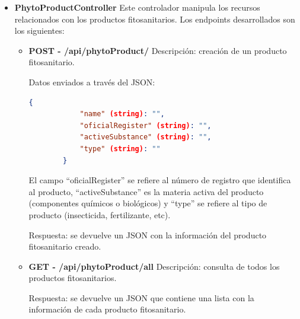 \begin{itemize}
\begin{itemize}
        Respuesta: se envía una respuesta sin contenido con código 204.

        \item \textbf{GET - /api/entity/user/{userId}} \newline
        Descripción: obtiene todas las entidades de un usuario específico. El ID del usuario es pasado como variable de la URL. 
        
        Respuesta: se devuelve un JSON que contiene una lista con la información de la asignación del usuario con cada entidad 
        (roles y permisos).
    \end{itemize}

    \item \textbf{PhytoProductController}
    \newline
    Este controlador manipula los recursos relacionados con los productos fitosanitarios. Los endpoints desarrollados son los siguientes:

    \begin{itemize}
        \item \textbf{POST - /api/phytoProduct/} \newline
        Descripción: creación de un producto fitosanitario. 

        Datos enviados a través del JSON:
        \begin{lstlisting}[language=json,caption={Creación de producto fitosanitario}]
        {
            "name" (string): "",
            "oficialRegister" (string): "",
            "activeSubstance" (string): "",
            "type" (string): ""
        }
        \end{lstlisting}

        El campo ``oficialRegister'' se refiere al número de registro que identifica al producto, ``activeSubstance'' es la materia activa del 
        producto (componentes químicos o biológicos) y ``type'' se refiere al tipo de producto (insecticida, fertilizante, etc).

        Respuesta: se devuelve un JSON con la información del producto fitosanitario creado.

        \item \textbf{GET - /api/phytoProduct/all} \newline
        Descripción: consulta de todos los productos fitosanitarios. 

        Respuesta: se devuelve un JSON que contiene una lista con la información de cada producto fitosanitario.
    \end{itemize}


\end{itemize}
